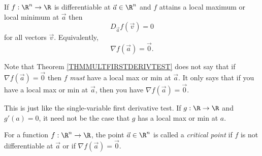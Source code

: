 \begin{theorem}
	\label{THMMULTFIRSTDERIVTEST}
	If $f:\R^n\to\R$ is differentiable at $\vec a\in\R^n$ and $f$ attains a
	local maximum or local minimum at $\vec a$ then 
	\[
		D_{\vec a}f(\vec v) = 0
	\]
	for all vectors $\vec v$.  Equivalently,
	\[
		\nabla f(\vec a)=\vec 0.
	\]
\end{theorem}
Note that Theorem \ref{THMMULTFIRSTDERIVTEST} does not say that if $\nabla f(\vec a)=\vec 0$
then $f$ \emph{must} have a local max or min at $\vec a$.  It only says that if
you have a local max or min at $\vec a$, then you have $\nabla f(\vec a)=\vec 0$.

This is just like the single-variable first derivative test.  If $g:\R\to\R$ and $g'(a)=0$,
it need not be the case that $g$ has a local max or min at $a$.

\begin{center}
\end{center}

\begin{definition}
	For a function $f:\R^n\to\R$, the point $\vec a\in\R^n$ is called
	a \emph{critical point} if $f$ is not
	differentiable at $\vec a$ or if $\nabla f(\vec a)=\vec 0$.
\end{definition}

